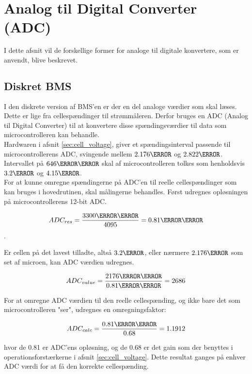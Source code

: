 \section{Analog til Digital Converter (ADC)}\label{afs:ADC}
I dette afsnit vil de forskellige former for analoge til digitale konvertere, som er anvendt, blive beskrevet. 

\subsection{Diskret BMS}
I den diskrete version af BMS'en er der en del analoge værdier som skal læses. Dette er lige fra cellespændinger til strømmåleren. Derfor bruges en ADC (Analog til Digital Converter) til at konvertere disse spændingsværdier til data som microcontrolleren kan behandle.
\\

Hardwaren i afsnit \ref{sec:cell_voltage}, giver et spændingsinterval passende til microcontrollerens ADC, svingende mellem $2.176\volt$ og $2.822\volt$. Intervallet på $646\milli\volt$ skal af microcontrolleren tolkes som henholdsvis $3.2\volt$ og $4.15\volt$.
\\

For at kunne omregne spændingerne på ADC'en til reelle cellespændinger som kan bruges i hovedrutinen, skal målingerne behandles. Først udregnes opløsningen på microcontrollerens 12-bit ADC. 

\begin {equation}
ADC_{res} =  \frac{3300\milli\volt}{4095} = 0.81\milli\volt 
\label{eq:ADC_res}
\end {equation}.

Er cellen på det lavest tilladte, altså $3.2\volt$, eller nærmere $2.176\volt$ som set af microen, kan ADC værdien udregnes.

\begin {equation}
ADC_{value} =  \frac{2176\milli\volt}{0.81\milli\volt} = 2686 
\label{eq:ADC_value}
\end {equation}

For at omregne ADC værdien til den reelle cellespænding, og ikke bare det som microcontrolleren "ser", udregnes en omregningsfaktor: 

\begin {equation}
ADC_{calc} =  \frac{0.81\milli\volt}{0.68} = 1.1912 
\label{eq:ADC_calc}
\end {equation}

hvor de 0.81 er ADC'ens opløsning, og de 0.68 er det gain som der benyttes i operationsforstærkerne i afsnit \ref{sec:cell_voltage}. Dette resultat ganges på enhver ADC værdi for at få den korrekte cellespænding. 

